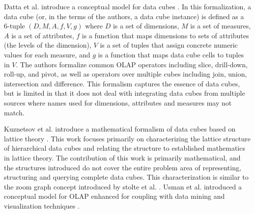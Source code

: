 \documentclass[12pt]{article}
\begin{document}
\begin{doublespace}
Datta et al. introduce a conceptual model for data cubes \cite{datta1999cube}. In this formalization, a data cube (or, in the terms of the authors, a data cube instance) is defined as a 6-tuple $(D, M, A, f, V, g)$ where $D$ is a set of dimensions, $M$ is a set of measures, $A$ is a set of attributes, $f$ is a function that maps dimensions to sets of attributes (the levels of the dimension), $V$ is a set of tuples that assign concrete numeric values for each measure, and $g$ is a function that maps data cube cells to tuples in $V$. The authors formalize common OLAP operators including slice, drill-down, roll-up, and pivot, as well as operators over multiple cubes including join, union, intersection and difference. This formalism captures the essence of data cubes, but is limited in that it does not deal with integrating data cubes from multiple sources where names used for dimensions, attributes and measures may not match.

Kuznetsov et al. introduce a mathematical formalism of data cubes based on lattice theory \cite{kuznetsov2009mathematical}. This work focuses primarily on characterizing the lattice structure of hierarchical data cubes and relating the structure to established mathematics in lattice theory. The contribution of this work is primarily mathematical, and the structures introduced do not cover the entire problem area of representing, structuring and querying complete data cubes. This characterization is similar to the zoom graph concept introduced by stolte et al. \cite{stolte2003multiscale}. Usman et al. introduced a conceptual model for OLAP enhanced for coupling with data mining and visualization techniques \cite{usman2009conceptual}.


\end{doublespace}
\end{document}
